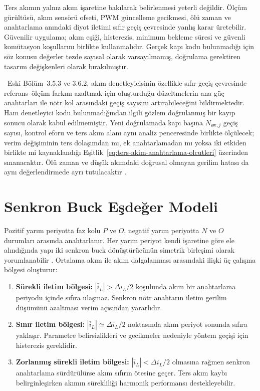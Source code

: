 Ters akımın yalnız akım işaretine bakılarak belirlenmesi yeterli değildir. Ölçüm gürültüsü, akım sensörü ofseti, PWM güncelleme gecikmesi, ölü zaman ve anahtarlama anındaki diyot iletimi sıfır geçiş çevresinde yanlış karar üretebilir. Güvenilir uygulama; akım eşiği, histerezis, minimum bekleme süresi ve güvenli komütasyon koşullarını birlikte kullanmalıdır. Gerçek kapı kodu bulunmadığı için söz konusu değerler tezde sayısal olarak varsayılmamış, doğrulama gerektiren tasarım değişkenleri olarak bırakılmıştır.

\eskitezetiketi\ Eski Bölüm~3.5.3 ve 3.6.2, akım denetleyicisinin özellikle sıfır geçiş çevresinde referans--ölçüm farkını azaltmak için oluşturduğu düzeltmelerin ana güç anahtarları ile nötr kol arasındaki geçiş sayısını artırabileceğini bildirmektedir. Ham denetleyici kodu bulunmadığından ilgili gözlem doğrulanmış bir kayıp sonucu olarak kabul edilmemiştir. Yeni doğrulamada kapı başına $N_{\mathrm{sw},j}$ geçiş sayısı, kontrol eforu ve ters akım alanı aynı analiz penceresinde birlikte ölçülecek; verim değişiminin ters dolaşımdan mı, ek anahtarlamadan mı yoksa iki etkiden birlikte mi kaynaklandığı Eşitlik~\eqref{eq:ters-akim-anahtarlama-olcutleri} üzerinden sınanacaktır. Ölü zaman ve düşük akımdaki doğrusal olmayan gerilim hatası da aynı değerlendirmede ayrı tutulacaktır \citep{Teodorescu2006PR,Zhang2014Deadtime}.

\section{Senkron Buck Eşdeğer Modeli}

Pozitif yarım periyotta faz kolu $P$ ve $O$, negatif yarım periyotta $N$ ve $O$ durumları arasında anahtarlanır. Her yarım periyot kendi işaretine göre ele alındığında yapı iki senkron buck dönüştürücünün simetrik birleşimi olarak yorumlanabilir \citep{Mohan2003,Erickson2001,Holmes2003}. Ortalama akım ile akım dalgalanması arasındaki ilişki üç çalışma bölgesi oluşturur:

\begin{enumerate}
  \item \textbf{Sürekli iletim bölgesi:} $|\bar i_L|>\Delta i_L/2$ koşulunda akım bir anahtarlama periyodu içinde sıfıra ulaşmaz. Senkron nötr anahtarın iletim gerilim düşümünü azaltması verim açısından yararlıdır.
  \item \textbf{Sınır iletim bölgesi:} $|\bar i_L|\simeq\Delta i_L/2$ noktasında akım periyot sonunda sıfıra yaklaşır. Parametre belirsizlikleri ve gecikmeler nedeniyle yöntem geçişi için histerezis gereklidir.
  \item \textbf{Zorlanmış sürekli iletim bölgesi:} $|\bar i_L|<\Delta i_L/2$ olmasına rağmen senkron anahtarlama sürdürülürse akım sıfırın ötesine geçer. Ters akım kaybı belirginleşirken akımın sürekliliği harmonik performansı destekleyebilir.
\end{enumerate}


